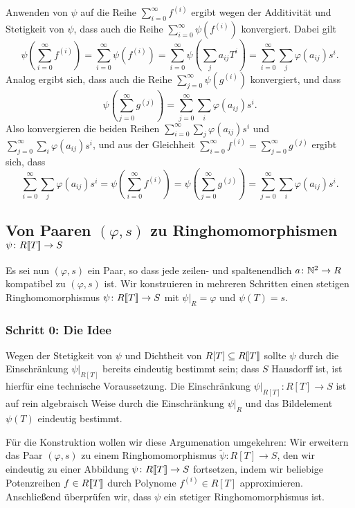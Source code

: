 \documentclass[a4paper, 10pt, numbers=noenddot]{scrartcl}
\begin{document}
Anwenden von $\psi$ auf die Reihe $\sum_{i=0}^\infty f^{(i)}$ ergibt wegen der Additivität und Stetigkeit von $\psi$, dass auch die Reihe $\sum_{i=0}^\infty \psi(f^{(i)})$ konvergiert.
Dabei gilt
\[
    \psi\left( \sum_{i=0}^\infty f^{(i)} \right)
  = \sum_{i=0}^\infty \psi\left( f^{(i)} \right)
  = \sum_{i=0}^\infty \psi\left( \sum_j a_{ij} T^i \right)
  = \sum_{i=0}^\infty \sum_j \varphi(a_{ij}) s^i.
\]
Analog ergibt sich, dass auch die Reihe $\sum_{j=0}^\infty \psi(g^{(i)})$ konvergiert, und dass
\[
    \psi\left( \sum_{j=0}^\infty g^{(j)} \right)
  = \sum_{j=0}^\infty \sum_i \varphi(a_{ij}) s^i.
\]
Also konvergieren die beiden Reihen $\sum_{i=0}^\infty \sum_j \varphi(a_{ij}) s^i$ und $\sum_{j=0}^\infty \sum_i \varphi(a_{ij}) s^i$, und aus der Gleichheit $\sum_{i=0}^\infty f^{(i)} = \sum_{j=0}^\infty g^{(j)}$ ergibt sich, dass
\[
    \sum_{i=0}^\infty \sum_j \varphi(a_{ij}) s^i
  = \psi\left( \sum_{i=0}^\infty f^{(i)} \right)
  = \psi\left( \sum_{j=0}^\infty g^{(j)} \right)
  = \sum_{j=0}^\infty \sum_i \varphi(a_{ij}) s^i.
\]


\subsection*{Von Paaren $(\varphi, s)$ zu Ringhomomorphismen $\psi \colon R[\![T]\!] \to S$}

Es sei nun $(\varphi, s)$ ein Paar, so dass jede zeilen- und spaltenendlich $a \colon \mathbb{N}^2 \to R$ kompatibel zu $(\varphi, s)$ ist.
Wir konstruieren in mehreren Schritten einen stetigen Ringhomomorphismus $\psi \colon R[\![T]\!] \to S$ mit $\psi|_R = \varphi$ und $\psi(T) = s$.


\subsubsection*{Schritt 0: Die Idee}
Wegen der Stetigkeit von $\psi$ und Dichtheit von $R[T] \subseteq R[\![T]\!]$ sollte $\psi$ durch die Einschränkung $\psi|_{R[T]}$ bereits eindeutig bestimmt sein; dass $S$ Hausdorff ist, ist hierfür eine technische Voraussetzung.
Die Einschränkung $\psi|_{R[T]} \colon R[T] \to S$ ist auf rein algebraisch Weise durch die Einschränkung $\psi|_R$ und das Bildelement $\psi(T)$ eindeutig bestimmt.

Für die Konstruktion wollen wir diese Argumenation umgekehren:
Wir erweitern das Paar $(\varphi, s)$ zu einem Ringhomomorphismus $\tilde{\psi} \colon R[T] \to S$, den wir eindeutig zu einer Abbildung $\psi \colon R[\![T]\!] \to S$ fortsetzen, indem wir beliebige Potenzreihen $f \in R[\![T]\!]$ durch Polynome $f^{(i)} \in R[T]$ approximieren. 
Anschließend überprüfen wir, dass $\psi$ ein stetiger Ringhomomorphismus ist.
\end{document}
